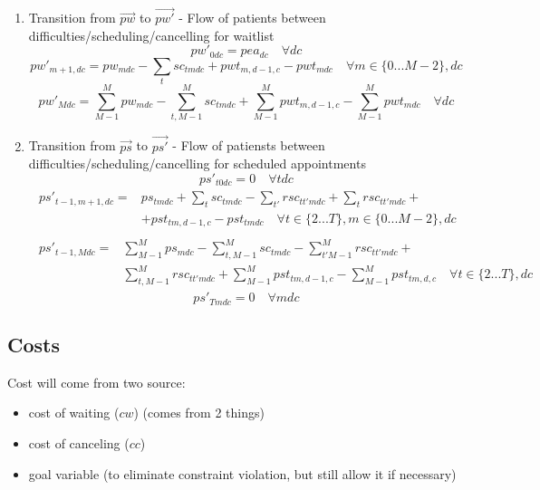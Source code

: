 \documentclass{article}
\begin{document}
\begin{enumerate}
	\item Transition from $\vec{pw}$ to $\vec{pw'}$ - Flow of patients between difficulties/scheduling/cancelling for waitlist
		\begin{equation}  
			pw'_{0dc} = pea_{dc} \quad \forall dc 
		\end{equation} 
		\begin{equation}  
			pw'_{m+1, dc} = pw_{mdc} - \sum_{t} sc_{tmdc} + pwt_{m,d-1,c} - pwt_{mdc} \quad \forall m \in \{0...M-2 \}, dc 
		\end{equation} 
		\begin{equation}  
			pw'_{Mdc} = \sum_{M-1}^M pw_{mdc} - \sum_{t,M-1}^{M} sc_{tmdc} + \sum_{M-1}^{M} pwt_{m,d-1,c} - 
			\sum_{M-1}^{M} pwt_{mdc}\quad \forall dc 
		\end{equation} 

	\item Transition from $\vec{ps}$ to $\vec{ps'}$ - Flow of patiensts between difficulties/scheduling/cancelling for scheduled appointments
		\begin{equation}
			ps'_{t0dc} = 0 \quad \forall tdc
		\end{equation}
		\begin{align}  \begin{split}
			ps'_{t-1,m+1,dc} = & ps_{tmdc} +  \sum_{t} sc_{tmdc} - \sum_{t'} rsc_{tt'mdc} + \sum_{t} rsc_{tt'mdc} +\\ 
										& + pst_{tm,d-1,c} - pst_{tmdc} \quad \forall t \in \{2 ... T\},  m \in \{0... M-2 \}, dc 
		\end{split} \end{align} 
		\begin{align} \begin{split}  
			ps'_{t-1,Mdc} = & \sum_{M-1}^M ps_{mdc}  - \sum_{t,M-1}^{M} sc_{tmdc}  - \sum_{t'M-1}^M rsc_{tt'mdc} + \\
									& \sum_{t,M-1}^M rsc_{tt'mdc} + \sum_{M-1}^{M} pst_{tm,d-1,c} - \sum_{M-1}^{M} pst_{tm,d,c}
									\quad \forall t \in \{2...T \}, dc 
		\end{split} \end{align}		
		\begin{equation}  
			ps'_{Tmdc} = 0 \quad \forall mdc 
		\end{equation} 
\end{enumerate}
    
\subsection{Costs}
Cost will come from two source:  
\begin{itemize} 
	\item cost of waiting ($cw$) (comes from 2 things)
	\item cost of canceling ($cc$)
	\item goal variable (to eliminate constraint violation, but still allow it if necessary)
\end{itemize}
\end{document}
